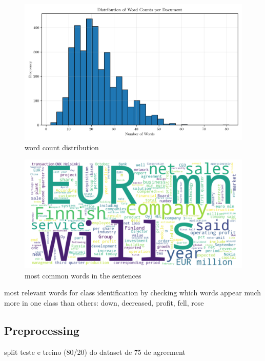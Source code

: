 \documentclass[conference]{IEEEtran}
\begin{document}
\begin{figure}[H]
    \centering
    \includegraphics[width=1\linewidth]{assets/word_count_distribution.png}
    \caption{word count distribution}
    \label{fig:word_count_distribution}
\end{figure}

\begin{figure}[H]
    \centering
    \includegraphics[width=1\linewidth]{assets/word_cloud_75agree.png}
    \caption{most common words in the sentences}
    \label{fig:word_cloud_75agree}
\end{figure}

most relevant words for class identification by checking which words appear much more in one class than others: down, decreased, profit, fell, rose


\subsection{Preprocessing}

split teste e treino (80/20) do dataset de 75 de agreement
\end{document}
